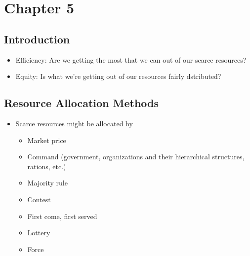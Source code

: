 \documentclass[11pt]{article}
\author{Sudhan Chitgopkar}
\date{\today}
\title{}
\begin{document}
\tableofcontents

\section{Chapter 5}
\label{sec:org1709f5f}
\subsection{Introduction}
\label{sec:orgff373f0}
\begin{itemize}
\item Efficiency: Are we getting the most that we can out of our scarce resources?
\item Equity: Is what we're getting out of our resources fairly dstributed?
\end{itemize}
\subsection{Resource Allocation Methods}
\label{sec:orgfaa2ea8}
\begin{itemize}
\item Scarce resources might be allocated by
\begin{itemize}
\item Market price
\item Command (government, organizations and their hierarchical structures, rations, etc.)
\item Majority rule
\item Contest
\item First come, first served
\item Lottery
\item Force
\end{itemize}
\end{itemize}
\end{document}
